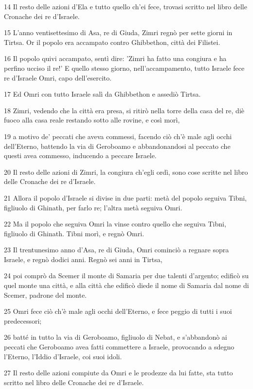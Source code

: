 \par 14 Il resto delle azioni d'Ela e tutto quello ch'ei fece, trovasi scritto nel libro delle Cronache dei re d'Israele.
\par 15 L'anno ventisettesimo di Asa, re di Giuda, Zimri regnò per sette giorni in Tirtsa. Or il popolo era accampato contro Ghibbethon, città dei Filistei.
\par 16 Il popolo quivi accampato, sentì dire: 'Zimri ha fatto una congiura e ha perfino ucciso il re!' E quello stesso giorno, nell'accampamento, tutto Israele fece re d'Israele Omri, capo dell'esercito.
\par 17 Ed Omri con tutto Israele salì da Ghibbethon e assediò Tirtsa.
\par 18 Zimri, vedendo che la città era presa, si ritirò nella torre della casa del re, diè fuoco alla casa reale restando sotto alle rovine, e così morì,
\par 19 a motivo de' peccati che aveva commessi, facendo ciò ch'è male agli occhi dell'Eterno, battendo la via di Geroboamo e abbandonandosi al peccato che questi avea commesso, inducendo a peccare Israele.
\par 20 Il resto delle azioni di Zimri, la congiura ch'egli ordì, sono cose scritte nel libro delle Cronache dei re d'Israele.
\par 21 Allora il popolo d'Israele si divise in due parti: metà del popolo seguiva Tibni, figliuolo di Ghinath, per farlo re; l'altra metà seguiva Omri.
\par 22 Ma il popolo che seguiva Omri la vinse contro quello che seguiva Tibni, figliuolo di Ghinath. Tibni morì, e regnò Omri.
\par 23 Il trentunesimo anno d'Asa, re di Giuda, Omri cominciò a regnare sopra Israele, e regnò dodici anni. Regnò sei anni in Tirtsa,
\par 24 poi comprò da Scemer il monte di Samaria per due talenti d'argento; edificò su quel monte una città, e alla città che edificò diede il nome di Samaria dal nome di Scemer, padrone del monte.
\par 25 Omri fece ciò ch'è male agli occhi dell'Eterno, e fece peggio di tutti i suoi predecessori;
\par 26 batté in tutto la via di Geroboamo, figliuolo di Nebat, e s'abbandonò ai peccati che Geroboamo avea fatti commettere a Israele, provocando a sdegno l'Eterno, l'Iddio d'Israele, coi suoi idoli.
\par 27 Il resto delle azioni compiute da Omri e le prodezze da lui fatte, sta tutto scritto nel libro delle Cronache dei re d'Israele.
